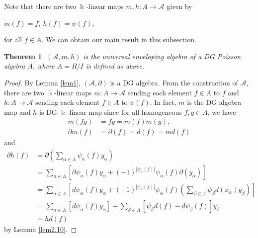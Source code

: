 \documentclass[a4paper,10pt]{amsart}
\newtheorem{theorem}{Theorem}[section]
\theoremstyle{definition}
\theoremstyle{remark}
\numberwithin{equation}{section}
\begin{document}
Note that there are two $\Bbbk$-linear maps $m, h: A\rightarrow
\mathcal{A}$ given by
\begin{center}
$m(f)=f, ~h(f)=\psi(f)$,
\end{center}
for all $f\in A$. We can obtain our main result in this subsection.

\begin{theorem}
$(\mathcal{A}, m, h)$ is the universal enveloping algebra of a DG Poisson
algebra $A$, where $A=R/I$ is defined as above.
\end{theorem}

\begin{proof}
By Lemma \ref{lem1}, $(\mathcal{A}, \partial)$ is a DG algebra. From the
construction of $\mathcal{A}$, there are two $\Bbbk$-linear maps
$m: A\rightarrow \mathcal{A}$ sending each element $f\in A$ to
$f$ and $h: A\rightarrow \mathcal{A}$ sending each element
$f\in A$ to $\psi(f)$. In fact, $m$ is the DG algebra map
and $h$ is DG $\Bbbk$-linear map since for all homogeneous $f, g\in
A$, we have
\begin{align*}
m(fg)&=fg=m(f)m(g), \\
\partial m(f)&=\partial(f)=d(f)=md(f)
\end{align*}
and
\begin{align*}
\partial h(f)&=\partial(\sum_{\alpha\in
\Lambda}\psi_{\alpha}(f)y_{\alpha})\\
&=\sum_{\alpha\in \Lambda}[\partial\psi_{\alpha}(f)y_{\alpha}+(-1)^{|\psi_{\alpha}(f)|}\psi_{\alpha}(f)\partial(y_{\alpha})]\\
&=\sum_{\alpha\in \Lambda}[d\psi_{\alpha}(f)y_{\alpha}+(-1)^{|\psi_{\alpha}(f)|}\psi_{\alpha}(f)({\sum_{\beta\in \Lambda}\psi_{\beta}d(x_{\alpha})y_{\beta}})]\\
&=\sum_{\alpha\in \Lambda}[d\psi_{\alpha}(f)y_{\alpha}]+\sum_{\beta\in \Lambda}[\psi_{\beta}d(f)-d\psi_{\beta}(f)]y_{\beta}\\
&=hd(f)
\end{align*}
by Lemma \ref{lem2.10}.


\end{proof}
\end{document}
